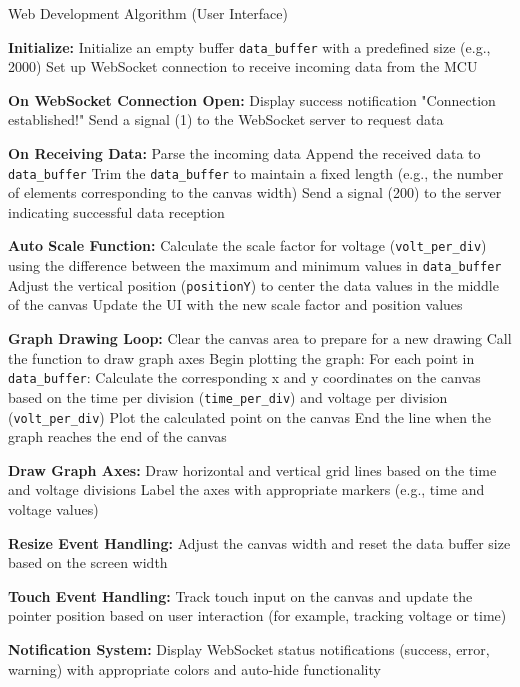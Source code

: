 \begin{algorithm}
\caption{Web Development Algorithm (User Interface)}
\begin{algorithmic}[1]
\STATE \textbf{Initialize:}
\STATE \quad Initialize an empty buffer \texttt{data\_buffer} with a predefined size (e.g., 2000)
\STATE \quad Set up WebSocket connection to receive incoming data from the MCU\cite{WebSocketAPI2024}

\STATE \textbf{On WebSocket Connection Open:}
\STATE \quad Display success notification "Connection established!"
\STATE \quad Send a signal (1) to the WebSocket server to request data

\STATE \textbf{On Receiving Data:}
\STATE \quad Parse the incoming data
\STATE \quad Append the received data to \texttt{data\_buffer}
\STATE \quad Trim the \texttt{data\_buffer} to maintain a fixed length (e.g., the number of elements corresponding to the canvas width)
\STATE \quad Send a signal (200) to the server indicating successful data reception

\STATE \textbf{Auto Scale Function:}
\STATE \quad Calculate the scale factor for voltage (\texttt{volt\_per\_div}) using the difference between the maximum and minimum values in \texttt{data\_buffer}
\STATE \quad Adjust the vertical position (\texttt{positionY}) to center the data values in the middle of the canvas
\STATE \quad Update the UI with the new scale factor and position values

\STATE \textbf{Graph Drawing Loop:}
\STATE \quad Clear the canvas area to prepare for a new drawing
\STATE \quad Call the function to draw graph axes
\STATE \quad Begin plotting the graph:
\STATE \quad \quad For each point in \texttt{data\_buffer}:
\STATE \quad \quad \quad Calculate the corresponding x and y coordinates on the canvas based on the time per division (\texttt{time\_per\_div}) and voltage per division (\texttt{volt\_per\_div})
\STATE \quad \quad \quad Plot the calculated point on the canvas
\STATE \quad \quad End the line when the graph reaches the end of the canvas

\STATE \textbf{Draw Graph Axes:}
\STATE \quad Draw horizontal and vertical grid lines based on the time and voltage divisions
\STATE \quad Label the axes with appropriate markers (e.g., time and voltage values)

\STATE \textbf{Resize Event Handling:}
\STATE \quad Adjust the canvas width and reset the data buffer size based on the screen width

\STATE \textbf{Touch Event Handling:}
\STATE \quad Track touch input on the canvas and update the pointer position based on user interaction (for example, tracking voltage or time)

\STATE \textbf{Notification System:}
\STATE \quad Display WebSocket status notifications (success, error, warning) with appropriate colors and auto-hide functionality

\end{algorithmic}
\end{algorithm}


